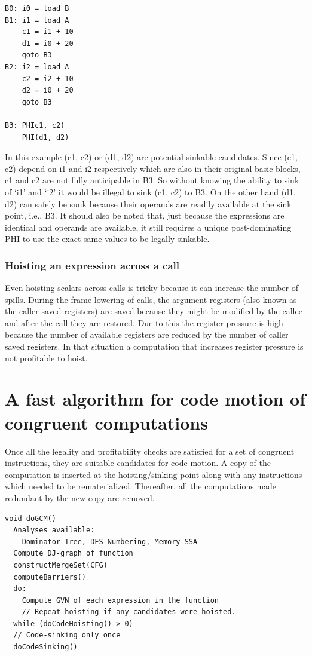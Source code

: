 \documentclass[sigplan,10pt,review,anonymous]{acmart}\settopmatter{printfolios=true,printccs=false,printacmref=false}
\begin{document}
\begin{lstlisting}
B0: i0 = load B
B1: i1 = load A
    c1 = i1 + 10
    d1 = i0 + 20
    goto B3
B2: i2 = load A
    c2 = i2 + 10
    d2 = i0 + 20
    goto B3

B3: PHIc1, c2)
    PHI(d1, d2)
\end{lstlisting}

In this example (c1, c2) or (d1, d2) are potential sinkable candidates. Since
(c1, c2) depend on i1 and i2 respectively which are also in their original basic
blocks, c1 and c2 are not fully anticipable in B3. So without knowing the ability to sink
of `i1' and `i2' it would be illegal to sink (c1, c2) to B3. On the other hand
(d1, d2) can safely be sunk because their operands are readily available at the
sink point, i.e., B3. It should also be noted that, just because the expressions
are identical and operands are available, it still requires a unique
post-dominating PHI to use the exact same values to be legally sinkable.

\subsubsection{Hoisting an expression across a call}
\label{cost:across-calls}
Even hoisting scalars across calls is tricky because it can increase the number
of spills. During the frame lowering of calls, the argument registers (also
known as the caller saved registers) are saved because they might be modified by
the callee and after the call they are restored. Due to this the register
pressure is high because the number of available registers are reduced by the
number of caller saved registers. In that situation a computation that increases
register pressure is not profitable to hoist.

\section{A fast algorithm for code motion of congruent computations}
\label{subsec:optimistic}
Once all the legality and profitability checks are satisfied for a set of
congruent instructions, they are suitable candidates for code motion. A
copy of the computation is inserted at the hoisting/sinking point along with any
instructions which needed to be rematerialized. Thereafter, all the computations
made redundant by the new copy are removed.


\begin{lstlisting}
void doGCM()
  Analyses available:
    Dominator Tree, DFS Numbering, Memory SSA
  Compute DJ-graph of function
  constructMergeSet(CFG)
  computeBarriers()
  do:
    Compute GVN of each expression in the function
    // Repeat hoisting if any candidates were hoisted.
  while (doCodeHoisting() > 0)
  // Code-sinking only once
  doCodeSinking()
\end{lstlisting}
\end{document}
